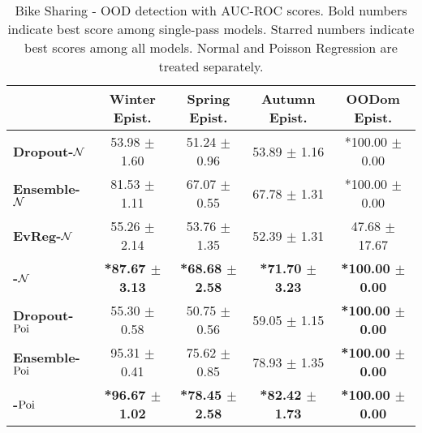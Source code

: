 \begin{table*}[ht]
    \centering
    \caption{Bike Sharing - OOD detection with AUC-ROC scores. Bold numbers indicate best score among single-pass models. Starred numbers indicate best scores among all models. Normal and Poisson Regression are treated separately.}
    \label{tab:auroc-bikesharing}
    \scriptsize
    \begin{tabular}{lcccc}
        \toprule
        & \textbf{Winter Epist.} & \textbf{Spring Epist.} & \textbf{Autumn Epist.} & \textbf{OODom Epist.} \\
        \midrule
        \textbf{Dropout-$\operatorname{\mathcal{N}}$} & 53.98 $\pm$ 1.60 & 51.24 $\pm$ 0.96 & 53.89 $\pm$ 1.16 & *100.00 $\pm$ 0.00 \\
        \textbf{Ensemble-$\operatorname{\mathcal{N}}$} & 81.53 $\pm$ 1.11 & 67.07 $\pm$ 0.55 & 67.78 $\pm$ 1.31 & *100.00 $\pm$ 0.00 \\
        \midrule
        \textbf{EvReg-$\operatorname{\mathcal{N}}$} & 55.26 $\pm$ 2.14 & 53.76 $\pm$ 1.35 & 52.39 $\pm$ 1.31 & 47.68 $\pm$ 17.67 \\
        \textbf{\NatPNacro{}-$\operatorname{\mathcal{N}}$} & \textbf{*87.67 $\pm$ 3.13} & \textbf{*68.68 $\pm$ 2.58} & \textbf{*71.70 $\pm$ 3.23} & \textbf{*100.00 $\pm$ 0.00} \\
        \midrule
        \midrule
        \textbf{Dropout-$\operatorname{Poi}$} & 55.30 $\pm$ 0.58 & 50.75 $\pm$ 0.56 & 59.05 $\pm$ 1.15 & \textbf{*100.00 $\pm$ 0.00} \\
        \textbf{Ensemble-$\operatorname{Poi}$} & 95.31 $\pm$ 0.41 & 75.62 $\pm$ 0.85 & 78.93 $\pm$ 1.35 & \textbf{*100.00 $\pm$ 0.00} \\
        \midrule
        \textbf{\NatPNacro{}-$\operatorname{Poi}$} & \textbf{*96.67 $\pm$ 1.02} & \textbf{*78.45 $\pm$ 2.58} & \textbf{*82.42 $\pm$ 1.73} & \textbf{*100.00 $\pm$ 0.00} \\
        \bottomrule
    \end{tabular}
\end{table*}